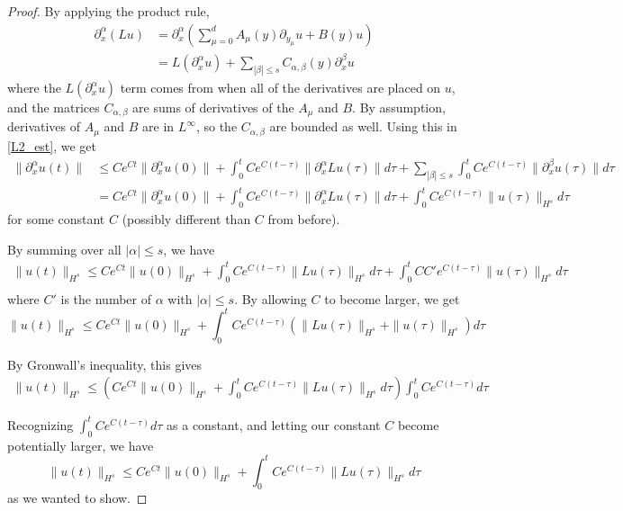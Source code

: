 \documentclass[a4paper]{article}
\begin{document}
\begin{enumerate}
\begin{proof}
      By applying the product rule,
      \begin{align*}
	\partial_x^\alpha (Lu) &= \partial_x^\alpha \left( \sum_{\mu = 0}^d A_\mu(y) \partial_{y_\mu} u + B(y) u \right) \\
	&= L(\partial_x^\alpha u) + \sum_{|\beta|\leq s} C_{\alpha,\beta}(y) \partial_x^\beta u
    \end{align*}
    where the $L(\partial_x^\alpha u)$ term comes from when all of the derivatives are placed on $u$, and the matrices $C_{\alpha,\beta}$ are sums of derivatives of the $A_\mu$ and $B$. By assumption, derivatives of $A_\mu$ and $B$ are in $L^\infty$, so the $C_{\alpha,\beta}$ are bounded as well.
    Using this in \eqref{L2_est}, we get
    \begin{align*}
      \|\partial_x^\alpha u(t) \| &\leq C e^{Ct} \|\partial_x^\alpha u(0) \| + \int_{0}^{t} C e^{C(t-\tau)} \|\partial_x^\alpha Lu(\tau)\|d\tau + \sum_{|\beta|\leq s} \int_{0}^{t} C e^{C(t-\tau)} \|\partial_x^\beta u(\tau) \| d\tau \\
      &= C e^{Ct} \|\partial_x^\alpha u(0) \| + \int_{0}^{t} C e^{C(t-\tau)} \|\partial_x^\alpha Lu(\tau)\|d\tau + \int_{0}^{t} C e^{C(t-\tau)} \|u(\tau)\|_{H^s} d\tau
    \end{align*}
    for some constant $C$ (possibly different than $C$ from before).

    By summing over all $|\alpha| \leq s$, we have
    \begin{align*}
      \|u(t)\|_{H^s} \leq C e^{Ct} \|u(0)\|_{H^s} + \int_{0}^{t} Ce^{C(t-\tau)} \|Lu(\tau)\|_{H^s} d\tau + \int_{0}^{t} C C' e^{C(t-\tau)} \|u(\tau)\|_{H^s} d\tau \\
    \end{align*}
    where $C'$ is the number of $\alpha$ with $|\alpha| \leq s$. By allowing $C$ to become larger, we get
    \begin{equation*}
      \|u(t)\|_{H^s} \leq C e^{Ct} \|u(0)\|_{H^s} + \int_{0}^{t} C e^{C(t-\tau)} \left( \|Lu(\tau)\|_{H^s} + \|u(\tau)\|_{H^s} \right) d\tau
    \end{equation*}

    By Gronwall's inequality, this gives
    \begin{align*}
      \|u(t)\|_{H^s} \leq \left( C e^{Ct}\|u(0)\|_{H^s} + \int_{0}^{t} C e^{C(t-\tau)} \|Lu(\tau)\|_{H^s} d\tau \right) \int_{0}^{t} C e^{C(t-\tau)} d\tau
    \end{align*}

    Recognizing $\int_{0}^{t} C e^{C(t-\tau)} d\tau$ as a constant, and letting our constant $C$ become potentially larger, we have
    \begin{equation*}
      \|u(t)\|_{H^s} \leq C e^{Ct} \|u(0)\|_{H^s} + \int_{0}^{t} C e^{C(t-\tau)} \|Lu(\tau)\|_{H^s} d\tau
    \end{equation*}
    as we wanted to show.
    \end{proof}


\end{enumerate}
\end{document}
